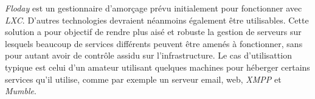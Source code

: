 \emph{Floday} est un gestionnaire d'amorçage prévu initialement pour fonctionner avec \emph{LXC}.
D'autres technologies devraient néanmoins également être utilisables.
Cette solution a pour objectif de rendre plus aisé et robuste la gestion de serveurs sur lesquels beaucoup de services différents peuvent être amenés à fonctionner, sans pour autant avoir de contrôle assidu sur l'infrastructure.
Le cas d'utilisattion typique est celui d'un amateur utilisant quelques machines pour héberger certains services qu'il utilise, comme par exemple un serveur email, web, \emph{XMPP} et \emph{Mumble}.
